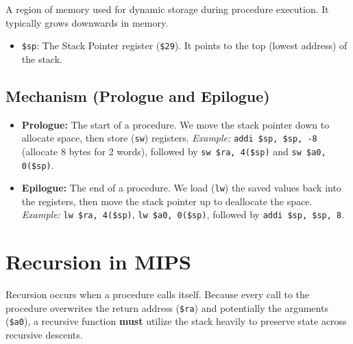 \begin{definition}
A region of memory used for dynamic storage during procedure execution. It typically grows downwards in memory.
\begin{itemize}
    \item \texttt{\$sp}: The Stack Pointer register (\texttt{\$29}). It points to the top (lowest address) of the stack.
\end{itemize}
\end{definition}

\subsection{Mechanism (Prologue and Epilogue)}
\begin{itemize}
    \item \textbf{Prologue:} The start of a procedure. We move the stack pointer down to allocate space, then store (\texttt{sw}) registers. 
    \textit{Example:} \texttt{addi \$sp, \$sp, -8} (allocate 8 bytes for 2 words), followed by \texttt{sw \$ra, 4(\$sp)} and \texttt{sw \$a0, 0(\$sp)}.
    \item \textbf{Epilogue:} The end of a procedure. We load (\texttt{lw}) the saved values back into the registers, then move the stack pointer up to deallocate the space.
    \textit{Example:} \texttt{lw \$ra, 4(\$sp)}, \texttt{lw \$a0, 0(\$sp)}, followed by \texttt{addi \$sp, \$sp, 8}.
\end{itemize}

\section{Recursion in MIPS}

Recursion occurs when a procedure calls itself. Because every call to the procedure overwrites the return address (\texttt{\$ra}) and potentially the arguments (\texttt{\$a0}), a recursive function \textbf{must} utilize the stack heavily to preserve state across recursive descents.

